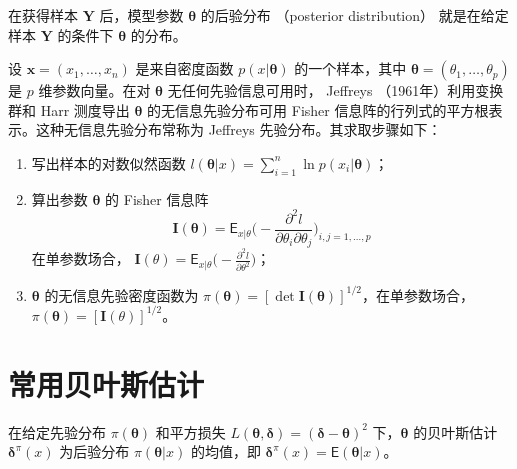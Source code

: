 \documentclass[12pt,a4paper,UTF8,twoside]{book}
\providecommand{\tightlist}{%
  \setlength{\itemsep}{0pt}\setlength{\parskip}{0pt}}
\theoremstyle{definition}
\theoremstyle{definition}
\theoremstyle{definition}
\theoremstyle{remark}
\let\BeginKnitrBlock\begin \let\EndKnitrBlock\end
\begin{document}
\BeginKnitrBlock{definition}[后验分布]
\protect\hypertarget{def:posterior-distribution}{}{\label{def:posterior-distribution} {} }在获得样本 \(\mathbf{Y}\) 后，模型参数 \(\boldsymbol{\theta}\) 的后验分布 （posterior distribution） 就是在给定样本 \(\mathbf{Y}\) 的条件下 \(\boldsymbol{\theta}\) 的分布\citep{mao2006}。
\EndKnitrBlock{definition}

\BeginKnitrBlock{definition}[Jeffreys 先验分布]
\protect\hypertarget{def:Jeffreys-prior-distribution}{}{\label{def:Jeffreys-prior-distribution} {} }设 \(\mathbf{x} = (x_1,\ldots,x_n)\) 是来自密度函数 \(p(x|\boldsymbol{\theta})\) 的一个样本，其中 \(\boldsymbol{\theta} = (\theta_1,\ldots,\theta_p)\) 是 \(p\) 维参数向量。在对 \(\boldsymbol{\theta}\) 无任何先验信息可用时， Jeffreys （1961年）利用变换群和 Harr 测度导出 \(\boldsymbol{\theta}\) 的无信息先验分布可用 Fisher 信息阵的行列式的平方根表示。这种无信息先验分布常称为 Jeffreys 先验分布。其求取步骤如下：
\EndKnitrBlock{definition}

\begin{enumerate}
\def\labelenumi{\arabic{enumi}.}
\tightlist
\item
  写出样本的对数似然函数 \(l(\boldsymbol{\theta}|x) = \sum_{i=1}^{n}\ln p(x_i | \boldsymbol{\theta})\)；
\item
  算出参数 \(\boldsymbol{\theta}\) 的 Fisher 信息阵 \[\mathbf{I}(\boldsymbol{\theta}) = \mathsf{E}_{x|\theta} \big( - \frac{\partial^2 l}{\partial \theta_i \partial \theta_j} \big)_{i,j=1,\ldots,p}\] 在单参数场合， \(\mathbf{I}(\theta) = \mathsf{E}_{x|\theta} \big( - \frac{\partial^2 l}{\partial \theta^2} \big)\)；
\item
  \(\boldsymbol{\theta}\) 的无信息先验密度函数为 \(\pi(\boldsymbol{\theta}) = [\det \mathbf{I}(\boldsymbol{\theta}) ]^{1/2}\)，在单参数场合， \(\pi(\boldsymbol{\theta}) = [\mathbf{I}(\theta) ]^{1/2}\)\citep{mao2006}。
\end{enumerate}

\hypertarget{sec:bayes-estimates}{%
\section{常用贝叶斯估计}\label{sec:bayes-estimates}}

\BeginKnitrBlock{theorem}[平方损失]
\protect\hypertarget{thm:bayes-estimate-square}{}{\label{thm:bayes-estimate-square} {} }在给定先验分布 \(\pi(\boldsymbol{\theta})\) 和平方损失 \(L(\boldsymbol{\theta},\boldsymbol{\delta}) = (\boldsymbol{\delta} - \boldsymbol{\theta})^2\) 下，\(\boldsymbol{\theta}\) 的贝叶斯估计 \(\boldsymbol{\delta}^{\pi}(x)\) 为后验分布 \(\pi(\boldsymbol{\theta}|x)\) 的均值，即 \(\boldsymbol{\delta}^{\pi}(x) = \mathsf{E}(\boldsymbol{\theta}|x)\)\citep{mao2006}。
\EndKnitrBlock{theorem}
\end{document}
